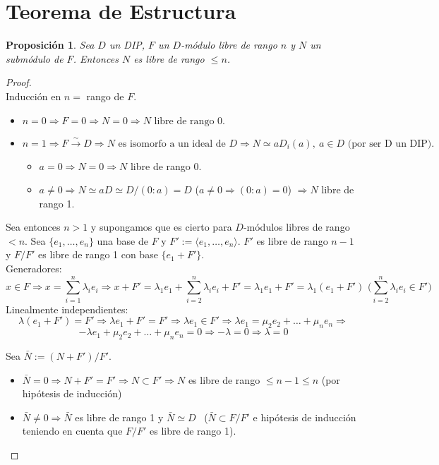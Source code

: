 \documentclass{article}
\theoremstyle{theorem-style}  %
\newtheorem{proposition}[theorem]{Proposición}
\theoremstyle{definition}
\theoremstyle{example-style}
\begin{document}
	\section{Teorema de Estructura}
	\begin{proposition}
		Sea $D$ un DIP, $F$ un $D$-módulo libre de rango $n$ y $N$ un submódulo de $F$. Entonces $N$ es libre de rango $\leq n$.
	\end{proposition}

	\begin{proof}\ \\
		Inducción en $n=$ rango de $F$.
		\begin{itemize}
			\item $n=0\Rightarrow F=0\Rightarrow N=0 \Rightarrow N \text{ libre de rango } 0.$
			\item $n=1 \Rightarrow F \xrightarrow{\sim} D \Rightarrow N \text{ es isomorfo a un ideal de } D \Rightarrow N\simeq aD_i(a), \ a\in D \text{ (por ser D un DIP)}.$
			\begin{itemize}
				\item $a=0 \Rightarrow N=0 \Rightarrow N$ libre de rango 0.
				\item $a\neq 0 \Rightarrow N\simeq aD\simeq D/(0:a) = D$ ($a\neq 0 \Rightarrow (0:a)=0$) $\Rightarrow N$ libre de rango 1.
			\end{itemize}
		\end{itemize}
		Sea entonces $n>1$ y supongamos que es cierto para $D$-módulos libres de rango $<n$. Sea $\{e_1,\dots,e_n\}$ una base de $F$ y $F':=\langle e_1,\dots,e_n\rangle$. $F'$ es libre de rango $n-1$ y $F/F'$ es libre de rango 1 con base $\{e_1+F'\}$.\\
		Generadores:
		\[x\in F \Rightarrow x=\sum_{i=1}^n\lambda_i e_i \Rightarrow x+F' = \lambda_1 e_1 + \sum_{i=2}^n\lambda_i e_i + F' = \lambda_1 e_1 + F' = \lambda_1(e_1+F') \text{ \ \ ($\sum_{i=2}^n \lambda_i e_i \in F'$) }\]
		Linealmente independientes:
		\[\lambda(e_1+F')=F'\Rightarrow \lambda e_1+F'=F' \Rightarrow \lambda e_1 \in F' \Rightarrow \lambda e_1 = \mu_2e_2+\dots+\mu_ne_n \Rightarrow\] 
		\[ -\lambda e_1+\mu_2e_2+\dots+\mu_ne_n=0 \Rightarrow -\lambda=0 \Rightarrow \lambda = 0\]

		Sea $\bar{N}:=(N+F')/F'$.
		\begin{itemize}
			\item $\bar{N}=0 \Rightarrow N+F'=F' \Rightarrow N\subset F' \Rightarrow N$ es libre de rango $\leq n-1 \leq n$ (por hipótesis de inducción)
			\item $\bar{N}\neq 0 \Rightarrow \bar{N}$ es libre de rango 1 y $\bar{N}\simeq D$ \  ($\bar{N}\subset F/F'$ e hipótesis de inducción teniendo en cuenta que $F/F'$ es libre de rango 1).
		\end{itemize}


\end{proof}
\end{document}
